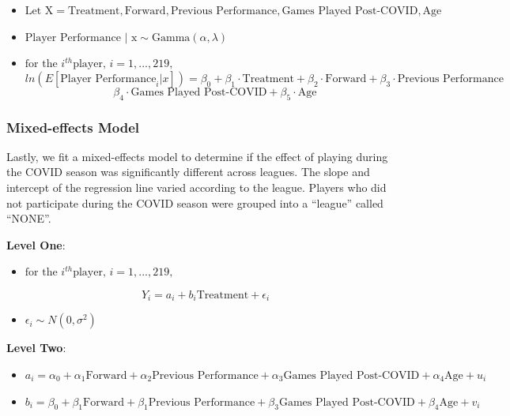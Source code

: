 \documentclass[12pt]{article}
\providecommand{\tightlist}{%
  \setlength{\itemsep}{0pt}\setlength{\parskip}{0pt}}
\begin{document}
\begin{itemize}
\tightlist
\item
  \(\text{Let X} = \text{Treatment}, \text{Forward}, \text{Previous Performance}, \text{Games Played Post-COVID}, \text{Age}\)
\item
  \(\text{Player Performance | x} \sim \text{Gamma}(\alpha, \lambda)\)
\item
  \(\text{for the }i^{th} \text{player, } i= 1,..., 219,\)
  \[ln(E[\text{Player Performance}_i | x]) =  \beta_0 + \beta_1 \cdot \text{Treatment} + \beta_2 \cdot \text{Forward} + \beta_3 \cdot \text{Previous Performance}\]
  \[ \beta_4 \cdot \text{Games Played Post-COVID} + \beta_5 \cdot \text{Age}\]
\end{itemize}

\hypertarget{mixed-effects-model}{%
\subsubsection{Mixed-effects Model}\label{mixed-effects-model}}

Lastly, we fit a mixed-effects model to determine if the effect of
playing during the COVID season was significantly different across
leagues. The slope and intercept of the regression line varied according
to the league. Players who did not participate during the COVID season
were grouped into a ``league'' called ``NONE''.

\textbf{Level One}:

\begin{itemize}
\tightlist
\item
  \(\text{for the }i^{th} \text{player, } i= 1,..., 219,\)
\end{itemize}

\[Y_i = a_i + b_i\text{Treatment} + \epsilon_i\]

\begin{itemize}
\tightlist
\item
  \(\epsilon_i \sim N(0, \sigma^2)\)
\end{itemize}

\textbf{Level Two}:

\begin{itemize}
\item
  \(a_i = \alpha_0 + \alpha_1\text{Forward} + \alpha_2\text{Previous Performance} + \alpha_3\text{Games Played Post-COVID} + \alpha_4\text{Age} + u_i\)
\item
  \(b_i = \beta_0 + \beta_1\text{Forward} + \beta_1\text{Previous Performance} + \beta_3\text{Games Played Post-COVID} + \beta_4\text{Age} + v_i\)
\end{itemize}
\end{document}
